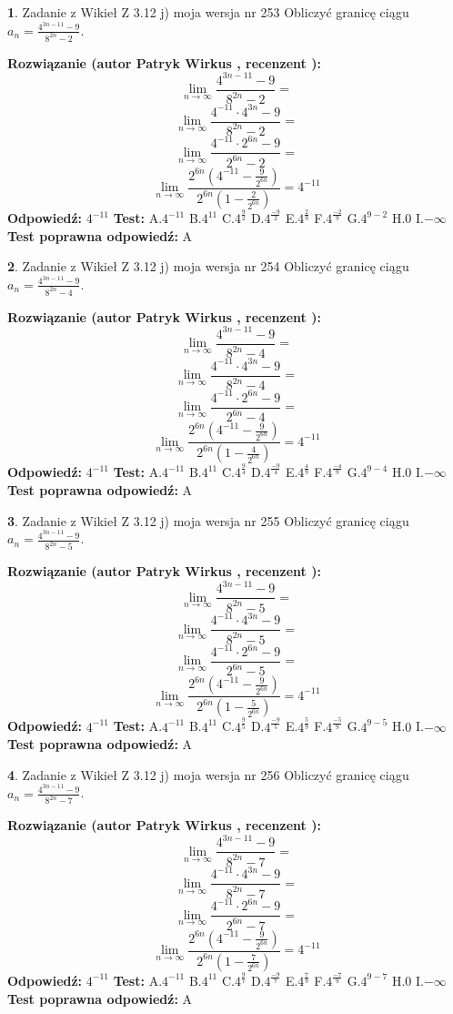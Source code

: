 \documentclass[12pt, a4paper]{article}
\theoremstyle{definition} %
\newtheorem{zad}{}
\newcommand{\zadStart}[1]{\begin{zad}#1\newline}
\newcommand{\zadStop}{\end{zad}}
\newcommand{\rozwStart}[2]{\noindent \textbf{Rozwiązanie (autor #1 , recenzent #2): }\newline}
\newcommand{\rozwStop}{\newline}
\newcommand{\odpStart}{\noindent \textbf{Odpowiedź:}\newline}
\newcommand{\odpStop}{\newline}
\newcommand{\testStart}{\noindent \textbf{Test:}\newline}
\newcommand{\testStop}{\newline}
\newcommand{\kluczStart}{\noindent \textbf{Test poprawna odpowiedź:}\newline}
\newcommand{\kluczStop}{\newline}
\begin{document}
\zadStart{Zadanie z Wikieł Z 3.12 j) moja wersja nr 253}
Obliczyć granicę ciągu $a_{n}=\frac{4^{3n-11}-9}{8^{2n}-2}$.
\zadStop
\rozwStart{Patryk Wirkus}{}
$$\lim\limits_{n\to\infty}\frac{4^{3n-11}-9}{8^{2n}-2}=$$
$$\lim\limits_{n\to\infty}\frac{4^{-11} \cdot 4^{3n}-9}{8^{2n}-2}=$$
$$\lim\limits_{n\to\infty}\frac{4^{-11} \cdot 2^{6n}-9}{2^{6n}-2}=$$
$$\lim\limits_{n\to\infty}\frac{2^{6n}(4^{-11} - \frac{9}{2^{6n}})}{2^{6n}(1-\frac{2}{2^{6n}})}= 4^{-11}$$
\rozwStop
\odpStart
$4^{-11}$
\odpStop
\testStart
A.$4^{-11}$
B.$4^{11}$
C.$4^{\frac{9}{2}}$
D.$4^{\frac{-9}{2}}$
E.$4^{\frac{2}{9}}$
F.$4^{\frac{-2}{9}}$
G.$4^{9-2}$
H.$0$
I.$-\infty$
\testStop
\kluczStart
A
\kluczStop



\zadStart{Zadanie z Wikieł Z 3.12 j) moja wersja nr 254}
Obliczyć granicę ciągu $a_{n}=\frac{4^{3n-11}-9}{8^{2n}-4}$.
\zadStop
\rozwStart{Patryk Wirkus}{}
$$\lim\limits_{n\to\infty}\frac{4^{3n-11}-9}{8^{2n}-4}=$$
$$\lim\limits_{n\to\infty}\frac{4^{-11} \cdot 4^{3n}-9}{8^{2n}-4}=$$
$$\lim\limits_{n\to\infty}\frac{4^{-11} \cdot 2^{6n}-9}{2^{6n}-4}=$$
$$\lim\limits_{n\to\infty}\frac{2^{6n}(4^{-11} - \frac{9}{2^{6n}})}{2^{6n}(1-\frac{4}{2^{6n}})}= 4^{-11}$$
\rozwStop
\odpStart
$4^{-11}$
\odpStop
\testStart
A.$4^{-11}$
B.$4^{11}$
C.$4^{\frac{9}{4}}$
D.$4^{\frac{-9}{4}}$
E.$4^{\frac{4}{9}}$
F.$4^{\frac{-4}{9}}$
G.$4^{9-4}$
H.$0$
I.$-\infty$
\testStop
\kluczStart
A
\kluczStop



\zadStart{Zadanie z Wikieł Z 3.12 j) moja wersja nr 255}
Obliczyć granicę ciągu $a_{n}=\frac{4^{3n-11}-9}{8^{2n}-5}$.
\zadStop
\rozwStart{Patryk Wirkus}{}
$$\lim\limits_{n\to\infty}\frac{4^{3n-11}-9}{8^{2n}-5}=$$
$$\lim\limits_{n\to\infty}\frac{4^{-11} \cdot 4^{3n}-9}{8^{2n}-5}=$$
$$\lim\limits_{n\to\infty}\frac{4^{-11} \cdot 2^{6n}-9}{2^{6n}-5}=$$
$$\lim\limits_{n\to\infty}\frac{2^{6n}(4^{-11} - \frac{9}{2^{6n}})}{2^{6n}(1-\frac{5}{2^{6n}})}= 4^{-11}$$
\rozwStop
\odpStart
$4^{-11}$
\odpStop
\testStart
A.$4^{-11}$
B.$4^{11}$
C.$4^{\frac{9}{5}}$
D.$4^{\frac{-9}{5}}$
E.$4^{\frac{5}{9}}$
F.$4^{\frac{-5}{9}}$
G.$4^{9-5}$
H.$0$
I.$-\infty$
\testStop
\kluczStart
A
\kluczStop



\zadStart{Zadanie z Wikieł Z 3.12 j) moja wersja nr 256}
Obliczyć granicę ciągu $a_{n}=\frac{4^{3n-11}-9}{8^{2n}-7}$.
\zadStop
\rozwStart{Patryk Wirkus}{}
$$\lim\limits_{n\to\infty}\frac{4^{3n-11}-9}{8^{2n}-7}=$$
$$\lim\limits_{n\to\infty}\frac{4^{-11} \cdot 4^{3n}-9}{8^{2n}-7}=$$
$$\lim\limits_{n\to\infty}\frac{4^{-11} \cdot 2^{6n}-9}{2^{6n}-7}=$$
$$\lim\limits_{n\to\infty}\frac{2^{6n}(4^{-11} - \frac{9}{2^{6n}})}{2^{6n}(1-\frac{7}{2^{6n}})}= 4^{-11}$$
\rozwStop
\odpStart
$4^{-11}$
\odpStop
\testStart
A.$4^{-11}$
B.$4^{11}$
C.$4^{\frac{9}{7}}$
D.$4^{\frac{-9}{7}}$
E.$4^{\frac{7}{9}}$
F.$4^{\frac{-7}{9}}$
G.$4^{9-7}$
H.$0$
I.$-\infty$
\testStop
\kluczStart
A
\kluczStop
\end{document}
